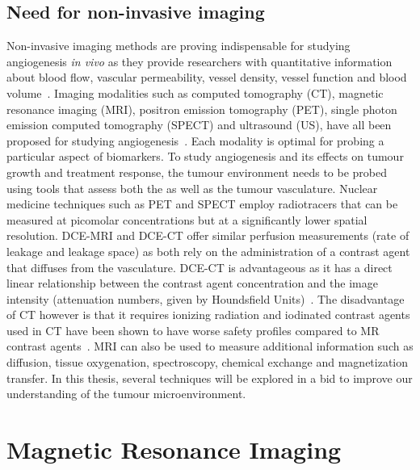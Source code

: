 \subsection{Need for non-invasive imaging}
Non-invasive imaging methods are proving indispensable for studying angiogenesis \emph{in vivo} as they provide researchers with quantitative information about blood flow, vascular permeability, vessel density, vessel function and blood volume~\cite{McDonald:2003cm}.
Imaging modalities such as computed tomography (CT), magnetic resonance imaging (MRI), positron emission tomography (PET), single photon emission computed tomography (SPECT) and ultrasound (US), have all been proposed for studying angiogenesis~\cite{Laking:2006ij}.
Each modality is optimal for probing a particular aspect of biomarkers. To study angiogenesis and its effects on tumour growth and treatment response, the tumour environment needs to be probed using tools that assess both the  as well as the tumour vasculature.
Nuclear medicine techniques such as PET and SPECT employ radiotracers that can be measured at picomolar concentrations but at a significantly lower spatial resolution.
DCE-MRI and DCE-CT offer similar perfusion measurements (rate of leakage and leakage space) as both rely on the administration of a contrast agent that diffuses from the vasculature.
DCE-CT is advantageous as it has a direct linear relationship between the contrast agent concentration and the image intensity (attenuation numbers, given by Houndsfield Units)~\cite{Cuenod:2006jy}.
The disadvantage of CT however is that it requires ionizing radiation and iodinated contrast agents used in CT have been shown to have worse safety profiles compared to MR contrast agents~\cite{Hasebroock:2009hw}.
MRI can also be used to measure additional information such as diffusion, tissue oxygenation, spectroscopy, chemical exchange and magnetization transfer. 
In this thesis, several techniques will be explored in a bid to improve our understanding of the tumour microenvironment.

\section{Magnetic Resonance Imaging}

